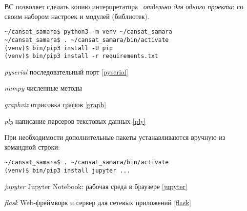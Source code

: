 \label{pyinst}\secdown


\noindent
ВС позволяет сделать копию интерпретатора \py\ \emph{отдельно для одного проекта}: со своим набором настроек и модулей (библиотек).

\begin{verbatim}
~/cansat_samara$ python3 -m venv ~/cansat_samara
~/cansat_samara$ . ~/cansat_samara/bin/activate
(venv)$ bin/pip3 install -U pip
(venv)$ bin/pip3 install -r requirements.txt
\end{verbatim}

\begin{description}[nosep]
    \item{\emph{pyserial}}  последовательный порт \ref{pyserial}
    \item{\emph{numpy}}     численные методы
    \item{\emph{graphviz}}  отрисовка графов \ref{graph}
    \item{\emph{ply}}       написание парсеров текстовых данных \ref{ply}
\end{description}

\clearpage
{}

При необходимости дополнительные пакеты устанавливаются вручную из командной строки:

\begin{verbatim}
~/cansat_samara$ . ~/cansat_samara/bin/activate
(venv)$ bin/pip3 install jupyter ...
\end{verbatim}

\begin{description}
    \item{\emph{jupyter}}   Jupyter Notebook: рабочая среда в браузере \ref{jupyter}
    \item{\emph{flask}}     Web-фреймворк и сервер для сетевых приложений \ref{flask}
\end{description}
    
\secup
